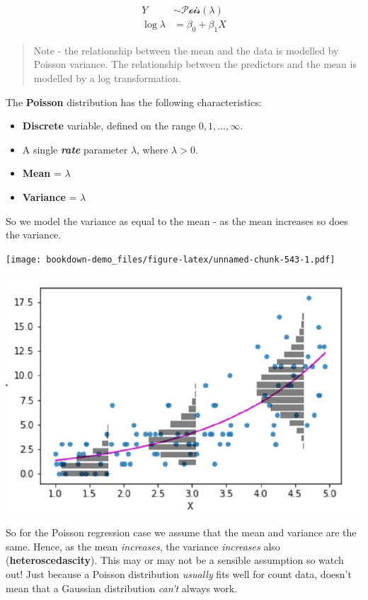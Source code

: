 \documentclass[
]{book}
\providecommand{\tightlist}{%
  \setlength{\itemsep}{0pt}\setlength{\parskip}{0pt}}
\begin{document}
\[
\begin{aligned}
Y & \sim \mathcal{Pois}(\lambda) \\
\log{\lambda} & = \beta_0 + \beta_1X
\end{aligned}
\]

\begin{quote}
Note - the relationship between the mean and the data is modelled by Poisson variance. The relationship between the predictors and the mean is modelled by a log transformation.
\end{quote}

The \textbf{Poisson} distribution has the following characteristics:

\begin{itemize}
\tightlist
\item
  \textbf{Discrete} variable, defined on the range \(0, 1, \dots, \infty\).
\item
  A single \textbf{\emph{rate}} parameter \(\lambda\), where \(\lambda > 0\).
\item
  \textbf{Mean} = \(\lambda\)\\
\item
  \textbf{Variance} = \(\lambda\)
\end{itemize}

So we model the variance as equal to the mean - as the mean increases so does the variance.

\texttt{[image: bookdown-demo\_files/figure-latex/unnamed-chunk-543-1.pdf]}

\includegraphics[width=0.8\linewidth]{images/poisson}

So for the Poisson regression case we assume that the mean and variance are the same.
Hence, as the mean \emph{increases}, the variance \emph{increases} also (\textbf{heteroscedascity}).
This may or may not be a sensible assumption so watch out! Just because a Poisson distribution \emph{usually} fits well for count data, doesn't mean that a Gaussian distribution \emph{can't} always work.
\end{document}
